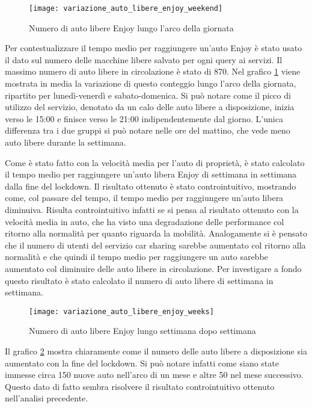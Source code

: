 \begin{figure}[H]
\texttt{[image: variazione\_auto\_libere\_enjoy\_weekend]}
\caption{Numero di auto libere Enjoy lungo l'arco della giornata}
\label{image:9}
\end{figure}

Per contestualizzare il tempo medio per raggiungere un'auto Enjoy è stato usato il dato sul numero delle macchine libere salvato per ogni query ai servizi. Il massimo numero di auto libere in circolazione è stato di 870. Nel grafico \ref{image:9} viene mostrata in media la variazione di questo conteggio lungo l'arco della giornata, ripartito per lunedì-venerdì e sabato-domenica. Si può notare come il picco di utilizzo del servizio, denotato da un calo delle auto libere a disposizione, inizia verso le 15:00 e finisce verso le 21:00 indipendentemente dal giorno. L'unica differenza tra i due gruppi si può notare nelle ore del mattino, che vede meno auto libere durante la settimana.

Come è stato fatto con la velocità media per l'auto di proprietà, è stato calcolato il tempo medio per raggiungere un'auto libera Enjoy di settimana in settimana dalla fine del lockdown. Il risultato ottenuto è stato controintuitivo, mostrando come, col passare del tempo, il tempo medio per raggiungere un'auto libera diminuiva. Risulta controintuitivo infatti se si pensa al risultato ottenuto con la velocità media in auto, che ha visto una degradazione delle performance col ritorno alla normalità per quanto riguarda la mobilità. Analogamente si è pensato che il numero di utenti del servizio car sharing sarebbe aumentato col ritorno alla normalità e che quindi il tempo medio per raggiungere un auto sarebbe aumentato col diminuire delle auto libere in circolazione. Per investigare a fondo questo risultato è stato calcolato il numero di auto libere di settimana in settimana.

\begin{figure}[H]
\texttt{[image: variazione\_auto\_libere\_enjoy\_weeks]}
\caption{Numero di auto libere Enjoy lungo settimana dopo settimana}
\label{image:10}
\end{figure}

Il grafico \ref{image:10} mostra chiaramente come il numero delle auto libere a disposizione sia aumentato con la fine del lockdown. Si può notare infatti come siano state immesse circa 150 nuove auto nell'arco di un mese e altre 50 nel mese successivo. Questo dato di fatto sembra risolvere il risultato controintuitivo ottenuto nell'analisi precedente.


